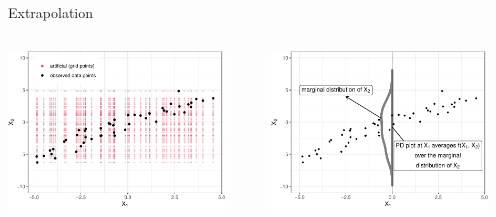 \documentclass[11pt,compress,t,notes=noshow, aspectratio=169, xcolor=table]{beamer}
\begin{document}
\begin{frame}{Extrapolation}


\begin{columns}[T]
\begin{column}{0.5\textwidth}
\centering
\includegraphics[width=0.9\textwidth]{figure/ale_scatter_grid}
\end{column}
\begin{column}{0.5\textwidth}
\centering
\includegraphics[width=0.9\textwidth]{figure/ale_pdplot}
\end{column}
\end{columns}


\end{frame}
\end{document}

